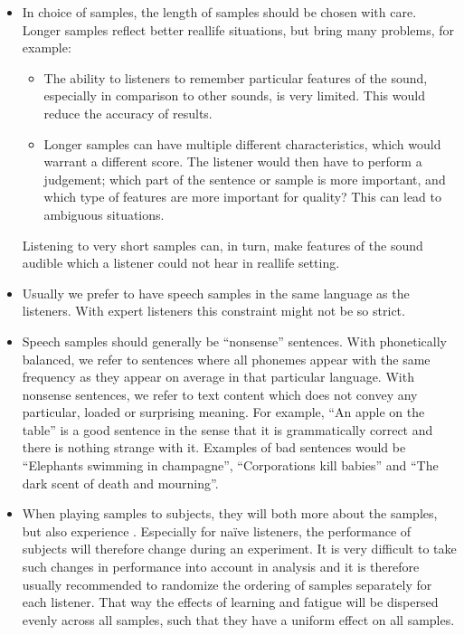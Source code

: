 \documentclass[letterpaper,10pt,english]{jupyterBook}
\begin{document}
\begin{itemize}
\item {} 
\sphinxAtStartPar
In choice of samples, the length of samples should be chosen with
care. Longer samples reflect better real\sphinxhyphen{}life situations, but bring
many problems, for example:
\begin{itemize}
\item {} 
\sphinxAtStartPar
The ability to listeners to remember particular features of the
sound, especially in comparison to other sounds, is very
limited. This would reduce the accuracy of results.

\item {} 
\sphinxAtStartPar
Longer samples can have multiple different characteristics,
which would warrant a different score. The listener would then
have to perform a judgement; which part of the sentence or
sample is more important, and which type of features are more
important for quality? This can lead to ambiguous situations.

\end{itemize}

\sphinxAtStartPar
Listening to very short samples can, in turn, make features of the
sound audible which a listener could not hear in real\sphinxhyphen{}life setting.

\item {} 
\sphinxAtStartPar
Usually we prefer to have speech samples in the same language as the
listeners. With expert listeners this constraint might not be so
strict.

\item {} 
\sphinxAtStartPar
Speech samples should generally be 
“nonsense” sentences. With phonetically balanced, we refer to
sentences where all phonemes appear with the same frequency as they
appear on average in that particular language. With nonsense
sentences, we refer to text content which does not convey any
particular, loaded or surprising meaning. For example, “An apple on
the table” is a good sentence in the sense that it is grammatically
correct and there is nothing strange with it. Examples of bad
sentences would be “Elephants swimming in champagne”, “Corporations
kill babies” and “The dark scent of death and mourning”.

\item {} 
\sphinxAtStartPar
When playing samples to subjects, they will both  more about
the samples, but also experience . Especially for naïve
listeners, the performance of subjects will therefore change during
an experiment. It is very difficult to take such changes in
performance into account in analysis and it is therefore usually
recommended to randomize the ordering of samples separately for each
listener. That way the effects of learning and fatigue will be
dispersed evenly across all samples, such that they have a uniform
effect on all samples.


\end{itemize}
\end{document}
